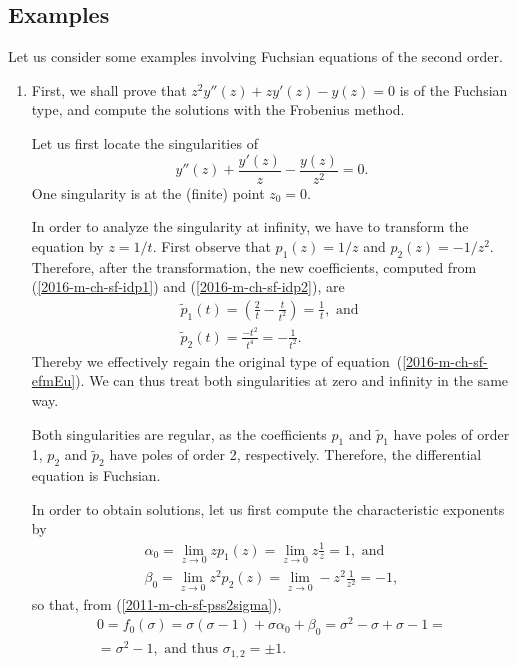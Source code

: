 {
\color{blue}
\bexample

\subsection{Examples}
Let us consider some examples involving Fuchsian equations of the second order.
\begin{enumerate}

\item
First, we shall prove that $z^2 y''(z) + z y'(z) - y(z) = 0$ is of the Fuchsian type, and compute the solutions with the Frobenius method.

Let us first locate the singularities of
\begin{equation}
y''(z) + \frac{y'(z)}{z} - \frac{y(z)}{z^2} = 0.
\label{2016-m-ch-sf-efmEu}
\end{equation}
One singularity is at the (finite) point  $z_0=0$.

In order to analyze the singularity at infinity, we have to transform the equation by $z=1/t$.
First observe that
$p_1(z)= 1/z$
and
$p_2(z)= -1/z^2$.
Therefore, after the transformation, the new coefficients, computed from
(\ref{2016-m-ch-sf-idp1}) and (\ref{2016-m-ch-sf-idp2}),
are
\begin{equation}
\begin{split}
\tilde p_1 (t) = \left( \frac{2}{t} - \frac{t}{t^2} \right) =   \frac{1}{t} , \textrm{ and }\\
\tilde p_2 (t) = \frac{- t^2}{t^4}  = -\frac{ 1}{t^2}
.
\end{split}
\end{equation}
Thereby we effectively regain the original type of equation~(\ref{2016-m-ch-sf-efmEu}).
We can thus treat both singularities at zero and infinity in the same way.

Both singularities are regular, as the coefficients
$p_1$ and $\tilde p_1$  have poles of order 1,
$p_2$ and $\tilde p_2$  have poles of order 2, respectively.
Therefore, the differential equation is Fuchsian.

In order to obtain solutions, let us first compute the  characteristic exponents
by
\begin{equation}
\begin{split}
\alpha_0 = \lim_{z \rightarrow 0} z p_1 (z) = \lim_{z \rightarrow 0} z\frac{1}{z} = 1
 , \textrm{ and }\\
\beta_0 = \lim_{z \rightarrow 0} z^2 p_2 (z) = \lim_{z \rightarrow 0} - z^2\frac{1}{z^2} = - 1
,
\end{split}
\end{equation}
so that, from
(\ref{2011-m-ch-sf-pss2sigma}),
\begin{equation}
\begin{split}
0= f_0(\sigma )  = \sigma({\sigma-1}) +  \sigma \alpha_{0} + \beta_{0}           =
\sigma^2 - \sigma +  \sigma  -1 = \\
= \sigma^2   -1
 , \textrm{ and  thus }
\sigma_{1,2} = \pm 1 .
\end{split}
\end{equation}


\end{enumerate}}
